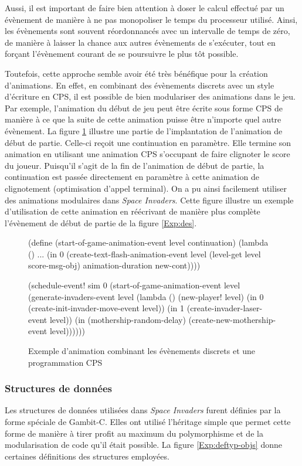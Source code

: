 \documentclass[12pt,twoside,letterpaper,francais]{book}
\newcommand{\scheme}[1]{\selectlanguage{english}{\tt #1}\selectlanguage{french}}
\begin{document}
Aussi, il est important de faire bien attention à doser le calcul
effectué par un évènement de manière à ne pas monopoliser le temps du
processeur utilisé. Ainsi, les évènements sont souvent réordonnancés
avec un intervalle de temps de zéro, de manière à laisser la chance
aux autres évènements de s'exécuter, tout en forçant l'évènement
courant de se poursuivre le plus tôt possible.

Toutefois, cette approche semble avoir été très bénéfique pour la
création d'animations. En effet, en combinant des évènements discrets
avec un style d'écriture en CPS, il est possible de bien modulariser
des animations dans le jeu. Par exemple, l'animation du début de jeu
peut être écrite sous forme CPS de manière à ce que la suite de cette
animation puisse être n'importe quel autre évènement. La figure
\ref{Exp:anim} illustre une partie de l'implantation de l'animation de
début de partie. Celle-ci reçoit une continuation en paramètre. Elle
termine son animation en utilisant une animation CPS s'occupant de
faire clignoter le score du joueur. Puisqu'il s'agit de la fin de
l'animation de début de partie, la continuation est passée directement
en paramètre à cette animation de clignotement (optimisation d'appel
terminal). On a pu ainsi facilement utiliser des animations modulaires
dans \textit{Space Invaders}. Cette figure illustre un exemple d'utilisation de cette
animation en réécrivant de manière plus complète l'évènement de début
de partie de la figure \ref{Exp:des}.\\

\begin{figure}[htb!]
  \begin{schemecode}
(define (start-of-game-animation-event level continuation)
  (lambda ()
    ...
    (in 0 (create-text-flash-animation-event level
            (level-get level score-msg-obj)
            animation-duration new-cont))))

(schedule-event! sim 0
  (start-of-game-animation-event level
    (generate-invaders-event level
      (lambda ()
        (new-player! level)
        (in 0 (create-init-invader-move-event level))
        (in 1 (create-invader-laser-event level))
        (in (mothership-random-delay)
            (create-new-mothership-event level))))))
  \end{schemecode}
  \caption{Exemple d'animation combinant les évènements discrets et
    une programmation CPS}
  \label{Exp:anim}
\end{figure}


\FloatBarrier
\subsubsection{Structures de données}
Les structures de données utilisées dans \textit{Space Invaders} furent définies par la
forme spéciale \scheme{define-type} de Gambit-C. Elles ont utilisé
l'héritage simple que permet cette forme de manière à tirer profit au
maximum du polymorphisme et de la modularisation de code qu'il était
possible. La figure \ref{Exp:deftyp-objs} donne certaines définitions
des structures employées.\\
\end{document}
